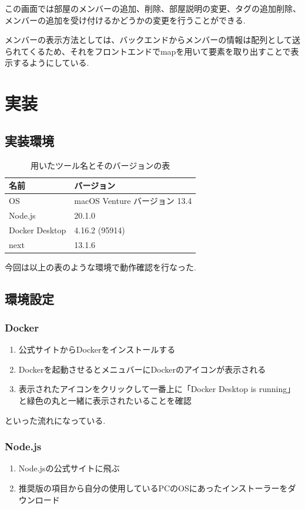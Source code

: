 \documentclass[submit,techrep]{ipsj}
\begin{document}
この画面では部屋のメンバーの追加、削除、部屋説明の変更、タグの追加削除、メンバーの追加を受け付けるかどうかの変更を行うことができる.

メンバーの表示方法としては、バックエンドからメンバーの情報は配列として送られてくるため、それをフロントエンドでmapを用いて要素を取り出すことで表示するようにしている.

\section{実装}

\subsection{実装環境}
\begin{table}[h]
 \caption{用いたツール名とそのバージョンの表}
 \label{table:SpeedOfLight}
 \centering
  \begin{tabular}{ll}
   \hline
   名前 & バージョン  \\
   \hline \hline
  OS & macOS Venture バージョン 13.4 \\
  Node.js &  20.1.0 \\
  Docker Desktop & 4.16.2 (95914) \\
  next & 13.1.6 \\

   \hline
  \end{tabular}
\end{table}

今回は以上の表のような環境で動作確認を行なった.

\subsection{環境設定}
\subsubsection{Docker}

\begin{enumerate}
  \item 公式サイトからDockerをインストールする
  \item Dockerを起動させるとメニュバーにDockerのアイコンが表示される
  \item  表示されたアイコンをクリックして一番上に「Docker Desktop is running」と緑色の丸と一緒に表示されたいることを確認
  \end{enumerate}
といった流れになっている.


\subsubsection{Node.js}
\begin{enumerate}
  \item Node.jsの公式サイトに飛ぶ
  \item 推奨版の項目から自分の使用しているPCのOSにあったインストーラーをダウンロード
  \end{enumerate}
  
\end{document}
